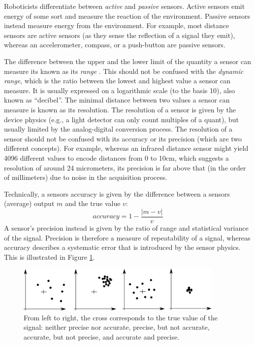 Roboticists differentiate between \emph{active} and \emph{passive} sensors. Active sensors  emit energy of some sort and measure the reaction of the environment. Passive sensors  instead measure energy from the environment. For example, most distance sensors are active sensors (as they sense the reflection of a signal they emit), whereas an accelerometer, compass, or a push-button are passive sensors.

The difference between the upper and the lower limit of the quantity a sensor can measure its known as its \emph{range} . This should not be confused with the  \emph{dynamic range}, which is the ratio between the lowest and highest value a sensor can measure. It is usually expressed on a logarithmic scale (to the basis 10), also known as ``decibel''. The minimal distance between two values a sensor can measure is known as its  resolution. The resolution of a sensor is given by the device physics (e.g., a light detector can only count multiples of a quant), but usually limited by the analog-digital conversion process. The resolution of a sensor should not be confused with its accuracy or its precision (which are two different concepts). For example, whereas an infrared distance sensor might yield 4096 different values to encode distances from 0 to 10cm, which suggests a resolution of around 24 micrometers, its precision is far above that (in the order of millimeters) due to noise in the acquisition process.

Technically, a sensors accuracy  is given by the difference between a sensors (average) output $m$ and the true value $v$:
\begin{equation}
accuracy=1-\frac{|m-v|}{v}
\end{equation}
A sensor's precision  instead is given by the ratio of range and statistical variance of the signal. Precision is therefore a measure of repeatability of a signal, whereas accuracy describes a systematic error that is introduced by the sensor physics. This is illustrated in Figure \ref{fig:precision}.
\begin{figure}
	\centering
		\includegraphics[width=0.9\textwidth]{figs/precisionvsaccuracy.png}
	\caption{From left to right, the cross corresponds to the true value of the signal: neither precise nor accurate, precise, but not accurate, accurate, but not precise, and accurate and precise. 
	\label{fig:precision}}
\end{figure}

